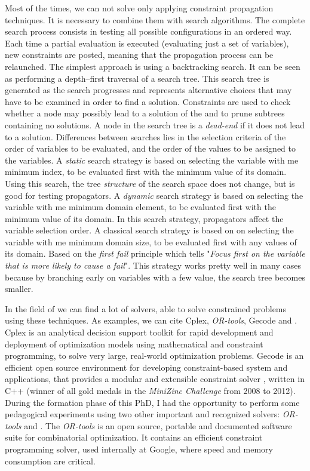 Most of the times, we can not solve \csps{} only applying constraint propagation techniques. It is necessary to combine them with search algorithms. The complete search process consists in testing all possible configurations in an ordered way. Each time a partial evaluation is executed (evaluating just a set of variables), new constraints are posted, meaning that the propagation process can be relaunched. The simplest approach is using a backtracking search. It can be seen as performing a depth--first traversal of a search tree. This search tree is generated as the search progresses and represents alternative choices that may have to be examined in order to find a solution. Constraints are used to check whether a node may possibly lead to a solution of the \csp{} and to prune subtrees containing no solutions. A node in the search
tree is a \textit{dead-end} if it does not lead to a solution. Differences between searches lies in the selection criteria of the order of variables to be evaluated, and the order of the values to be assigned to the variables. A \textit{static} search strategy is based on selecting the variable with me minimum index, to be evaluated first with the minimum value of its domain. Using this search, the tree \textit{structure} of the search space does not change, but is good for testing propagators. A \textit{dynamic} search strategy is based on selecting the variable with me minimum domain element, to be evaluated first with the minimum value of its domain. In this search strategy, propagators affect the variable selection order. A classical search strategy is based on on selecting the variable with me minimum domain size, to be evaluated first with any values of its domain. Based on the \textit{first fail} principle which tells "\textit{Focus first on the variable that is more likely to cause a fail}". This strategy works pretty well in many cases because by branching early on variables with a few value, the search tree becomes smaller.

In the field of \cp{} we can find a lot of solvers, able to solve constrained problems using these techniques. As examples, we can cite {\sc Cplex}, \textit{OR-tools}, {\sc Gecode} and \choco. {\sc Cplex} is an analytical decision support toolkit for rapid development and deployment of optimization models using mathematical and constraint programming, to solve very large, real-world optimization problems. {\sc Gecode} is an efficient open source environment for developing constraint-based system and applications, that provides a modular and extensible constraint solver \cite{Gecode}, written in C++ (winner of all gold medals in the \textit{MiniZinc Challenge} from 2008 to 2012). During the formation phase of this PhD, I had the opportunity to perform some pedagogical experiments using two other important and recognized solvers: \textit{OR-tools} and \choco. The \textit{OR-tools} is an open source, portable and documented software suite for combinatorial optimization. It contains an efficient  constraint programming solver, used internally at Google, where speed and memory consumption are critical.

